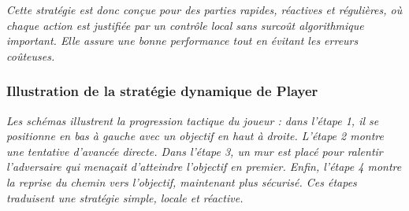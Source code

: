 \textit{Cette stratégie est donc conçue pour des parties rapides, réactives et régulières, où chaque action est justifiée par un contrôle local sans surcoût algorithmique important. Elle assure une bonne performance tout en évitant les erreurs coûteuses.}


\subsubsection{Illustration de la stratégie dynamique de Player}

\textit{Les schémas illustrent la progression tactique du joueur : dans l’étape 1, il se positionne en bas à gauche avec un objectif en haut à droite. L’étape 2 montre une tentative d’avancée directe. Dans l’étape 3, un mur est placé pour ralentir l’adversaire qui menaçait d’atteindre l’objectif en premier. Enfin, l’étape 4 montre la reprise du chemin vers l’objectif, maintenant plus sécurisé. Ces étapes traduisent une stratégie simple, locale et réactive.}

